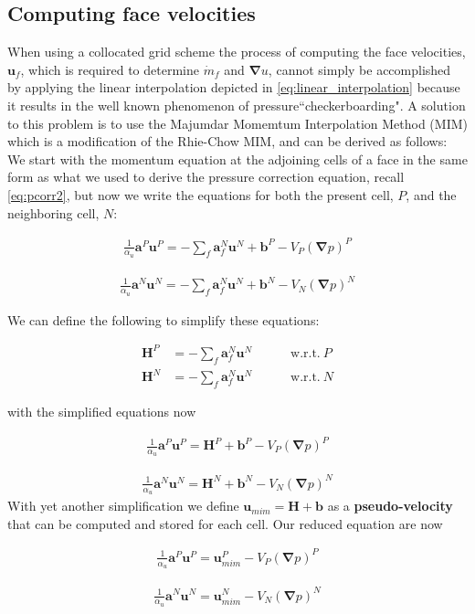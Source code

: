 \documentclass[11pt,letterpaper,titlepage]{article}
\newcommand{\beq}{\begin{equation*}
\begin{aligned}}
\newcommand{\eeq}{\end{aligned}
\end{equation*}}
\newcommand{\beqn}{\begin{equation}
	\begin{aligned}}
\newcommand{\eeqn}{\end{aligned}
	\end{equation}}
\newcommand{\bnabla}{\boldsymbol{\nabla}}
\newcommand{\bvel}{\mathbf{u}}
\numberwithin{equation}{section}
\begin{document}
\subsection{Computing face velocities}
When using a collocated grid scheme the process of computing the face velocities, $\bvel_f$, which is required to determine $\dot{m}_f$ and $\bnabla u$, cannot simply be accomplished by applying the linear interpolation depicted in \eqref{eq:linear_interpolation} because it results in the well known phenomenon of pressure``checkerboarding". A solution to this problem is to use the Majumdar Momemtum Interpolation Method (MIM) which is a modification of the Rhie-Chow MIM, and can be derived as follows:
\newline
\newline
We start with the momentum equation at the adjoining cells of a face in the same form as what we used to derive the pressure correction equation, recall \eqref{eq:pcorr2}, but now we write the equations for both the present cell, $P$, and the neighboring cell, $N$:

\beq
\frac{1}{\alpha_u} \mathbf{a}^P \bvel^P  = 
- \sum_f \mathbf{a}_f^N \bvel^N +
\mathbf{b}^P 
-V_P (\bnabla p)^P
\eeq

\beq
\frac{1}{\alpha_u} \mathbf{a}^N \bvel^N  = 
- \sum_f \mathbf{a}_f^N \bvel^N +
\mathbf{b}^N
-V_N (\bnabla p)^N
\eeq

We can define the following to simplify these equations:

\beqn
\mathbf{H}^P &= -\sum_f \mathbf{a}_f^N \bvel^N \quad \quad \quad \text{w.r.t.}  \ P \\
\mathbf{H}^N &= -\sum_f \mathbf{a}_f^N \bvel^N \quad \quad \quad \text{w.r.t.}  \ N 
\eeqn

with the simplified equations now

\beq
\frac{1}{\alpha_u} \mathbf{a}^P \bvel^P  = 
\mathbf{H}^P +
\mathbf{b}^P
-V_P (\bnabla p)^P
\eeq

\beq
\frac{1}{\alpha_u} \mathbf{a}^N \bvel^N  = 
\mathbf{H}^N +
\mathbf{b}^N
-V_N (\bnabla p)^N
\eeq
\newline
With yet another simplification we define $\bvel_{mim} = \mathbf{H} + \mathbf{b}$ as a \textbf{pseudo-velocity} that can be computed and stored for each cell. Our reduced equation are now

\beq
\frac{1}{\alpha_u} \mathbf{a}^P \bvel^P  = \bvel_{mim}^P - V_P (\bnabla p)^P
\eeq

\beq
\frac{1}{\alpha_u} \mathbf{a}^N \bvel^N  = \bvel_{mim}^N - V_N (\bnabla p)^N
\eeq
\end{document}
